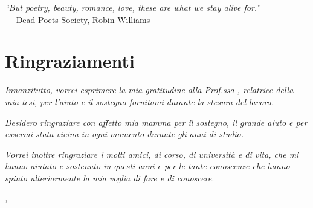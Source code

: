 \cleardoublepage
{}
{}

\begin{flushright}{
    \slshape
    ``But poetry, beauty, romance, love, these are what we stay alive for.''} \\
    \medskip
    --- Dead Poets Society, Robin Williams
\end{flushright}


\bigskip

\begingroup
\let\clearpage\relax
\let\cleardoublepage\relax
\let\cleardoublepage\relax

\chapter*{Ringraziamenti}

\noindent \textit{Innanzitutto, vorrei esprimere la mia gratitudine alla Prof.ssa \myProf, relatrice della mia tesi, per l'aiuto e il sostegno fornitomi durante la stesura del lavoro.}

\noindent \textit{Desidero ringraziare con affetto mia mamma per il sostegno, il grande aiuto e per essermi stata vicina in ogni momento durante gli anni di studio.}

\noindent \textit{Vorrei inoltre ringraziare i molti amici, di corso, di università e di vita, che mi hanno aiutato e sostenuto in questi anni e per le tante conoscenze che hanno spinto ulteriormente la mia voglia di fare e di conoscere.}
\bigskip

\noindent\textit{\myLocation, \myTime}
\hfill \myName\endgroup
